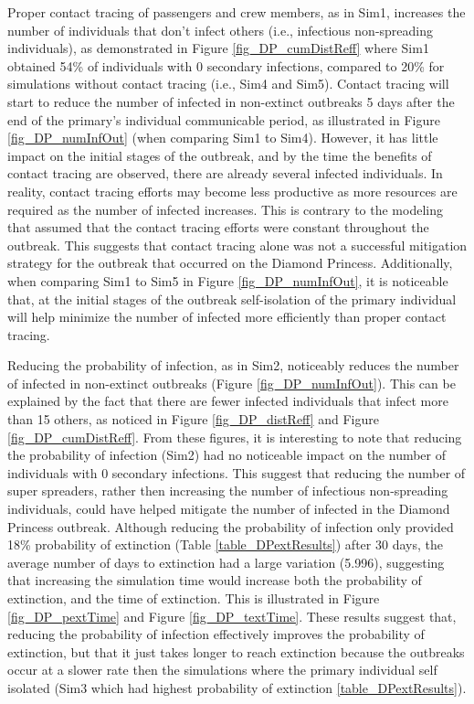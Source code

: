 \documentclass[sr]{drdc-report}
\begin{document}
Proper contact tracing of passengers and crew members, as in Sim1, increases the number of individuals that don't infect others (i.e., infectious non-spreading individuals), as demonstrated in Figure \ref{fig_DP_cumDistReff} where Sim1 obtained 54\% of individuals with 0 secondary infections, compared to 20\% for simulations without contact tracing (i.e., Sim4 and Sim5). Contact tracing will start to reduce the number of infected in non-extinct outbreaks 5 days after the end of the primary's individual communicable period, as illustrated in Figure \ref{fig_DP_numInfOut} (when comparing Sim1 to Sim4). However, it has little impact on the initial stages of the outbreak, and by the time the benefits of contact tracing are observed, there are already several infected individuals. In reality, contact tracing efforts may become less productive as more resources are required as the number of infected increases. This is contrary to the modeling that assumed that the contact tracing efforts were constant throughout the outbreak. This suggests that contact tracing alone was not a successful mitigation strategy for the outbreak that occurred on the Diamond Princess. Additionally, when comparing Sim1 to Sim5 in Figure \ref{fig_DP_numInfOut}, it is noticeable that, at the initial stages of the outbreak self-isolation of the primary individual will help minimize the number of infected more efficiently than proper contact tracing. 

Reducing the probability of infection, as in Sim2, noticeably reduces the number of infected in non-extinct outbreaks (Figure \ref{fig_DP_numInfOut}). This can be explained by the fact that there are fewer infected individuals that infect more than 15 others, as noticed in Figure \ref{fig_DP_distReff} and Figure \ref{fig_DP_cumDistReff}. From these figures, it is interesting to note that reducing the probability of infection (Sim2) had no noticeable impact on the number of individuals with 0 secondary infections. This suggest that reducing the number of super spreaders, rather then increasing the number of infectious non-spreading individuals, could have helped mitigate the number of infected in the Diamond Princess outbreak. Although reducing the probability of infection only provided 18\% probability of extinction (Table \ref{table_DPextResults}) after 30 days, the average number of days to extinction had a large variation (5.996), suggesting that increasing the simulation time would increase both the probability of extinction, and the time of extinction. This is illustrated in Figure \ref{fig_DP_pextTime} and Figure \ref{fig_DP_textTime}. These results suggest that, reducing the probability of infection effectively improves the probability of extinction, but that it just takes longer to reach extinction because the outbreaks occur at a slower rate then the simulations where the primary individual self isolated (Sim3 which had highest probability of extinction \ref{table_DPextResults}). 
\end{document}
